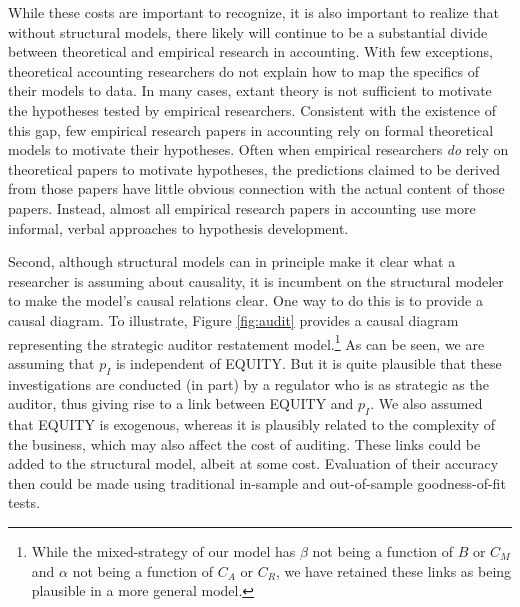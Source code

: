 \documentclass[12pt,reqno,titlepage]{amsart}
\theoremstyle{definition}
\begin{document}
\begin{doublespace}
While these costs are important to recognize, it is also important to realize that without structural models, there likely will continue to be a substantial divide between theoretical and empirical research in accounting.
With few exceptions, theoretical accounting researchers do not explain how to map the specifics of their models to data. 
In many cases, extant theory is not sufficient to motivate the hypotheses tested by empirical researchers.
Consistent with the existence of this gap, few empirical research papers in accounting rely on formal theoretical models to motivate their hypotheses. 
Often when empirical researchers \emph{do} rely on theoretical papers to motivate hypotheses, the predictions claimed to be derived from those papers have little obvious connection with the actual content of those papers.
Instead, almost all empirical research papers in accounting use more informal, verbal approaches to hypothesis development.

Second, although structural models can in principle make it clear what a researcher is assuming about causality, it is incumbent on the structural modeler to make the model's causal relations clear.
One way to do this is to provide a causal diagram.
To illustrate, Figure \ref{fig:audit} provides a causal diagram representing the strategic auditor restatement model.\footnote{
While the mixed-strategy of our model has $\beta$ not being a function of $B$ or $C_M$ and $\alpha$ not being a function of $C_A$ or $C_R$, we have retained these links as being plausible in a more general model.}
As can be seen, we are assuming that $p_I$ is independent of EQUITY. 
But it is quite plausible that these investigations are conducted (in part) by a regulator who is as strategic as the auditor, thus giving rise to a link between EQUITY and $p_I$.
We also assumed that EQUITY is exogenous, whereas it is plausibly related to the complexity of the business, which may also affect the cost of auditing.
These links could be added to the structural model, albeit at some cost.
Evaluation of their accuracy then could be made using traditional in-sample and out-of-sample goodness-of-fit tests.


\end{doublespace}
\end{document}
